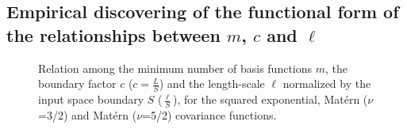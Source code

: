 \subsection{Empirical discovering of the functional form of the relationships between $m$, $c$ and $\ell$} \label{subsec_empiric_relations}

\begin{figure}
\centering
{}
\caption{Relation among the minimum number of basis functions $m$, the boundary factor $c$ \hspace{0.1mm} ($c = \frac{L}{S}$) \hspace{0.1mm} and the length-scale $\ell$ normalized by {\color{blue}the input space boundary $S$} ($\frac{\ell}{S}$), for the squared exponential, Mat\'ern ($\nu$=3/2) and Mat\'ern ($\nu$=5/2) covariance functions.}
  \label{fig5_relationships}
\end{figure}

